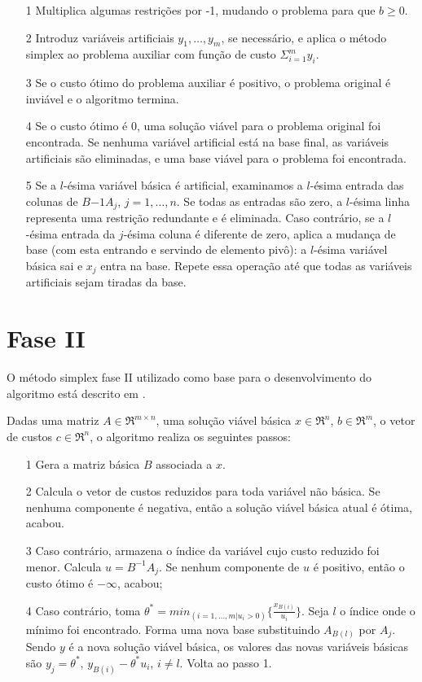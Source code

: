 \documentclass[
	12pt,				%
	openright,			%
	oneside,			%
	a4paper,			%
	english,			%
	french,				%
	spanish,			%
	brazil,				%
	]{abntex2}
\begin{document}
\begin{itemize}
\item[1] Multiplica algumas restrições por -1, mudando o problema para que $b \geq 0$.
\item[2] Introduz variáveis artificiais $y_1, \ldots, y_m$, se necessário, e aplica o método simplex ao problema auxiliar com função de custo $ \Sigma_{i=1}^{m}y_i $.
\item[3] Se o custo ótimo do problema auxiliar é positivo, o problema original é inviável e o algoritmo termina.
\item[4] Se o custo ótimo é 0, uma solução viável para o problema original foi encontrada. Se nenhuma variável artificial está na base final, as variáveis artificiais são eliminadas, e uma base viável para o problema foi encontrada.
\item[5] Se a $l$-ésima variável básica é artificial, examinamos a $l$-ésima entrada das colunas de $B{-1}A_j$, $j = 1, \ldots, n$. Se todas as entradas são zero, a $l$-ésima linha representa uma restrição redundante e é eliminada. Caso contrário, se a $l$-ésima entrada da $j$-ésima coluna é diferente de zero, aplica a mudança de base (com esta entrando e servindo de elemento pivô): a $l$-ésima variável básica sai e $x_j$ entra na base. Repete essa operação até que todas as variáveis artificiais sejam tiradas da base. 
\end{itemize}

\section{Fase II}
O método simplex fase II utilizado como base para o desenvolvimento do algoritmo está descrito em
  . 
  
  Dadas uma matriz $A \in \Re ^{m \times n}$, uma solução viável básica $x \in \Re ^n$, $b \in \Re ^m$, o vetor de custos $c \in\Re ^n$, o algoritmo realiza os seguintes passos:
  
\begin{itemize}
\item[1] Gera a matriz básica $B$ associada a $x$.
\item[2] Calcula o vetor de custos reduzidos para toda variável não
 básica. Se nenhuma componente é negativa, então a solução viável básica atual é
 ótima, acabou. 
\item[3]Caso contrário, armazena o índice da variável cujo custo reduzido foi menor.
Calcula $u = B^{-1}A_j$. Se nenhum componente de $u$ é positivo,
então o custo ótimo é $- \infty$, acabou;
\item[4]Caso contrário, toma $\theta ^* = min_{(i = 1,\ldots,m|u_i > 0)} \{\frac{x_{B(i)}}{u_i}\} $.
Seja $l$ o índice onde o mínimo foi encontrado. Forma uma nova
base substituindo $A_{B(l)}$ por $A_j$. Sendo $y$ é a nova solução viável básica, os valores
das novas variáveis básicas são $y_j = \theta ^*$, $y_{B(i)} - \theta ^* u_i$, $i\neq l$. Volta ao passo 1.
\end{itemize}
\end{document}
